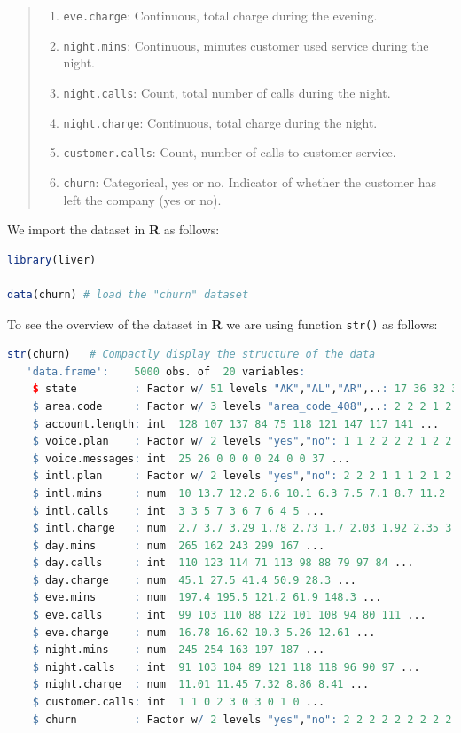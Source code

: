 \documentclass[
]{book}
\newcommand{\passthrough}[1]{#1}
\theoremstyle{definition}
\theoremstyle{definition}
\theoremstyle{definition}
\theoremstyle{definition}
\theoremstyle{remark}
\begin{document}
\begin{quote}
\begin{enumerate}
\item
  \passthrough{\lstinline!eve.charge!}: Continuous, total charge during the evening.
\item
  \passthrough{\lstinline!night.mins!}: Continuous, minutes customer used service during the night.
\item
  \passthrough{\lstinline!night.calls!}: Count, total number of calls during the night.
\item
  \passthrough{\lstinline!night.charge!}: Continuous, total charge during the night.
\item
  \passthrough{\lstinline!customer.calls!}: Count, number of calls to customer service.
\item
  \passthrough{\lstinline!churn!}: Categorical, yes or no. Indicator of whether the customer has left the company (yes or no).
\end{enumerate}
\end{quote}

We import the dataset in \textbf{R} as follows:

\begin{lstlisting}[language=R]
library(liver)

data(churn) # load the "churn" dataset
\end{lstlisting}

To see the overview of the dataset in \textbf{R} we are using function \passthrough{\lstinline!str()!} as follows:

\begin{lstlisting}[language=R]
str(churn)   # Compactly display the structure of the data
   'data.frame':    5000 obs. of  20 variables:
    $ state         : Factor w/ 51 levels "AK","AL","AR",..: 17 36 32 36 37 2 20 25 19 50 ...
    $ area.code     : Factor w/ 3 levels "area_code_408",..: 2 2 2 1 2 3 3 2 1 2 ...
    $ account.length: int  128 107 137 84 75 118 121 147 117 141 ...
    $ voice.plan    : Factor w/ 2 levels "yes","no": 1 1 2 2 2 2 1 2 2 1 ...
    $ voice.messages: int  25 26 0 0 0 0 24 0 0 37 ...
    $ intl.plan     : Factor w/ 2 levels "yes","no": 2 2 2 1 1 1 2 1 2 1 ...
    $ intl.mins     : num  10 13.7 12.2 6.6 10.1 6.3 7.5 7.1 8.7 11.2 ...
    $ intl.calls    : int  3 3 5 7 3 6 7 6 4 5 ...
    $ intl.charge   : num  2.7 3.7 3.29 1.78 2.73 1.7 2.03 1.92 2.35 3.02 ...
    $ day.mins      : num  265 162 243 299 167 ...
    $ day.calls     : int  110 123 114 71 113 98 88 79 97 84 ...
    $ day.charge    : num  45.1 27.5 41.4 50.9 28.3 ...
    $ eve.mins      : num  197.4 195.5 121.2 61.9 148.3 ...
    $ eve.calls     : int  99 103 110 88 122 101 108 94 80 111 ...
    $ eve.charge    : num  16.78 16.62 10.3 5.26 12.61 ...
    $ night.mins    : num  245 254 163 197 187 ...
    $ night.calls   : int  91 103 104 89 121 118 118 96 90 97 ...
    $ night.charge  : num  11.01 11.45 7.32 8.86 8.41 ...
    $ customer.calls: int  1 1 0 2 3 0 3 0 1 0 ...
    $ churn         : Factor w/ 2 levels "yes","no": 2 2 2 2 2 2 2 2 2 2 ...
\end{lstlisting}
\end{document}
